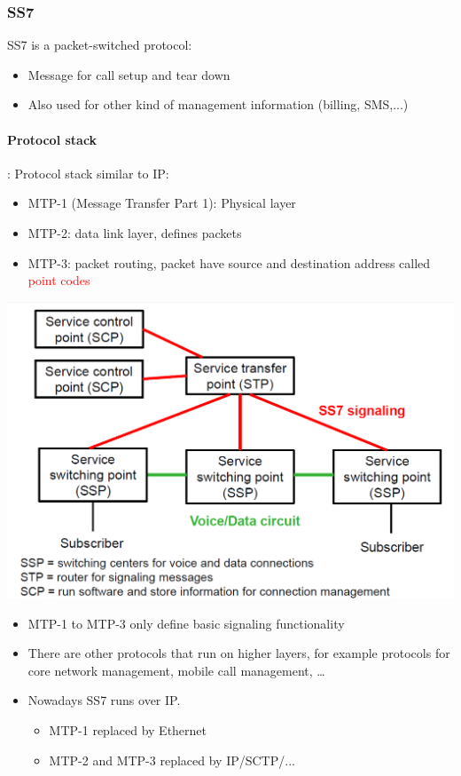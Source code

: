 \subsubsection{SS7}
SS7 is a packet-switched protocol:
\begin{itemize}
    \item Message for call setup and tear down
    \item Also used for other kind of management information (billing,
        SMS,...)
\end{itemize}

\paragraph{Protocol stack}: Protocol stack similar to IP:
\begin{itemize}
    \item MTP-1 (Message Transfer Part 1): Physical layer
    \item MTP-2: data link layer, defines packets
    \item MTP-3: packet routing, packet have source and destination
        address called \textcolor{red}{point codes}
\end{itemize}
\begin{center}
    \includegraphics[width=0.5\linewidth]{img/ss7.png}
\end{center}

\begin{itemize}
    \item MTP-1 to MTP-3 only define basic signaling functionality
    \item There are other protocols that run on higher layers, for example protocols for core 
        network management, mobile call management, \ldots
    \item Nowadays SS7 runs over IP.
        \begin{itemize}
            \item MTP-1 replaced by Ethernet
            \item MTP-2 and MTP-3 replaced by IP/SCTP/...
        \end{itemize}
\end{itemize}


